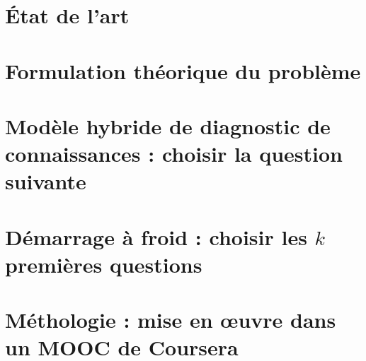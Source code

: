 \documentclass[a4paper,12pt,draft]{book}
\begin{document}
\tableofcontents

\chapter{État de l'art}



\chapter{Formulation théorique du problème}


\chapter{Modèle hybride de diagnostic de connaissances : choisir la question suivante}



\chapter{Démarrage à froid : choisir les $k$ premières questions}


\chapter{Méthologie : mise en œuvre dans un MOOC de Coursera}

\end{document}
